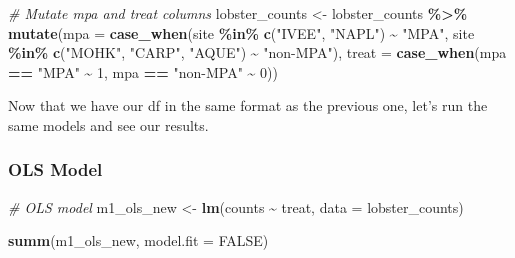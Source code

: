 \documentclass[
]{article}
\newenvironment{Shaded}{\begin{snugshade}}{\end{snugshade}}
\newcommand{\AttributeTok}[1]{\textcolor[rgb]{0.13,0.29,0.53}{#1}}
\newcommand{\CommentTok}[1]{\textcolor[rgb]{0.56,0.35,0.01}{\textit{#1}}}
\newcommand{\ConstantTok}[1]{\textcolor[rgb]{0.56,0.35,0.01}{#1}}
\newcommand{\DecValTok}[1]{\textcolor[rgb]{0.00,0.00,0.81}{#1}}
\newcommand{\FunctionTok}[1]{\textcolor[rgb]{0.13,0.29,0.53}{\textbf{#1}}}
\newcommand{\NormalTok}[1]{#1}
\newcommand{\OtherTok}[1]{\textcolor[rgb]{0.56,0.35,0.01}{#1}}
\newcommand{\SpecialCharTok}[1]{\textcolor[rgb]{0.81,0.36,0.00}{\textbf{#1}}}
\newcommand{\StringTok}[1]{\textcolor[rgb]{0.31,0.60,0.02}{#1}}
\begin{document}
\begin{Shaded}
\begin{Highlighting}[]
\CommentTok{\# Mutate mpa and treat columns}
\NormalTok{lobster\_counts }\OtherTok{\textless{}{-}}\NormalTok{ lobster\_counts }\SpecialCharTok{\%\textgreater{}\%} 
    \FunctionTok{mutate}\NormalTok{(}\AttributeTok{mpa =} \FunctionTok{case\_when}\NormalTok{(site }\SpecialCharTok{\%in\%} \FunctionTok{c}\NormalTok{(}\StringTok{"IVEE"}\NormalTok{, }\StringTok{"NAPL"}\NormalTok{) }\SpecialCharTok{\textasciitilde{}} \StringTok{"MPA"}\NormalTok{,}
\NormalTok{                           site }\SpecialCharTok{\%in\%} \FunctionTok{c}\NormalTok{(}\StringTok{"MOHK"}\NormalTok{, }\StringTok{"CARP"}\NormalTok{, }\StringTok{"AQUE"}\NormalTok{) }\SpecialCharTok{\textasciitilde{}} \StringTok{"non{-}MPA"}\NormalTok{),}
           \AttributeTok{treat =} \FunctionTok{case\_when}\NormalTok{(mpa }\SpecialCharTok{==} \StringTok{"MPA"} \SpecialCharTok{\textasciitilde{}} \DecValTok{1}\NormalTok{,}
\NormalTok{                             mpa }\SpecialCharTok{==} \StringTok{"non{-}MPA"} \SpecialCharTok{\textasciitilde{}} \DecValTok{0}\NormalTok{))}
\end{Highlighting}
\end{Shaded}

Now that we have our df in the same format as the previous one, let's
run the same models and see our results.

\hypertarget{ols-model}{%
\subsubsection{OLS Model}\label{ols-model}}

\begin{Shaded}
\begin{Highlighting}[]
\CommentTok{\# OLS model }
\NormalTok{m1\_ols\_new }\OtherTok{\textless{}{-}} \FunctionTok{lm}\NormalTok{(counts }\SpecialCharTok{\textasciitilde{}}\NormalTok{ treat, }\AttributeTok{data =}\NormalTok{ lobster\_counts)}

\FunctionTok{summ}\NormalTok{(m1\_ols\_new, }\AttributeTok{model.fit =} \ConstantTok{FALSE}\NormalTok{) }
\end{Highlighting}
\end{Shaded}
\end{document}
